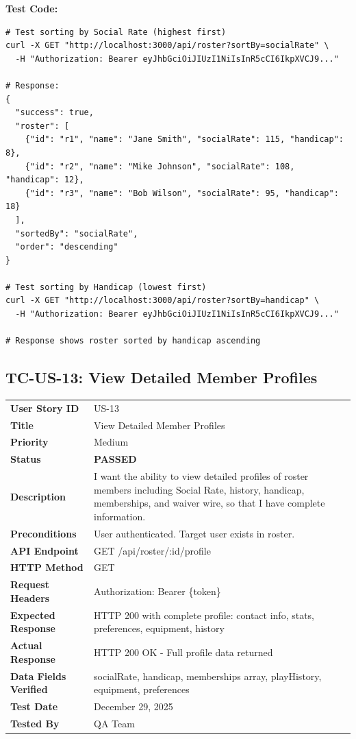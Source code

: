 \documentclass[11pt,a4paper]{article}
\newcommand{\passed}{\textcolor{pass}{\textbf{PASSED}}}
\begin{document}
\vspace{0.3cm}
\textbf{Test Code:}
\begin{lstlisting}
# Test sorting by Social Rate (highest first)
curl -X GET "http://localhost:3000/api/roster?sortBy=socialRate" \
  -H "Authorization: Bearer eyJhbGciOiJIUzI1NiIsInR5cCI6IkpXVCJ9..."

# Response:
{
  "success": true,
  "roster": [
    {"id": "r1", "name": "Jane Smith", "socialRate": 115, "handicap": 8},
    {"id": "r2", "name": "Mike Johnson", "socialRate": 108, "handicap": 12},
    {"id": "r3", "name": "Bob Wilson", "socialRate": 95, "handicap": 18}
  ],
  "sortedBy": "socialRate",
  "order": "descending"
}

# Test sorting by Handicap (lowest first)
curl -X GET "http://localhost:3000/api/roster?sortBy=handicap" \
  -H "Authorization: Bearer eyJhbGciOiJIUzI1NiIsInR5cCI6IkpXVCJ9..."

# Response shows roster sorted by handicap ascending
\end{lstlisting}

\vspace{0.5cm}


\subsection{TC-US-13: View Detailed Member Profiles}

\begin{tabularx}{\textwidth}{|p{3.2cm}|Y|}
\hline
{}
 \\
\hline
\textbf{User Story ID} & US-13 \\
\hline
\textbf{Title} & View Detailed Member Profiles \\
\hline
\textbf{Priority} & Medium \\
\hline
\textbf{Status} & \passed \\
\hline
\textbf{Description} & I want the ability to view detailed profiles of roster members including Social Rate, history, handicap, memberships, and waiver wire, so that I have complete information. \\
\hline
\textbf{Preconditions} & User authenticated. Target user exists in roster. \\
\hline
\textbf{API Endpoint} & GET /api/roster/:id/profile \\
\hline
\textbf{HTTP Method} & GET \\
\hline
\textbf{Request Headers} & Authorization: Bearer \{token\} \\
\hline
\textbf{Expected Response} & HTTP 200 with complete profile: contact info, stats, preferences, equipment, history \\
\hline
\textbf{Actual Response} & HTTP 200 OK - Full profile data returned \\
\hline
\textbf{Data Fields Verified} & socialRate, handicap, memberships array, playHistory, equipment, preferences \\
\hline
\textbf{Test Date} & December 29, 2025 \\
\hline
\textbf{Tested By} & QA Team \\
\hline
\end{tabularx}
\end{document}
